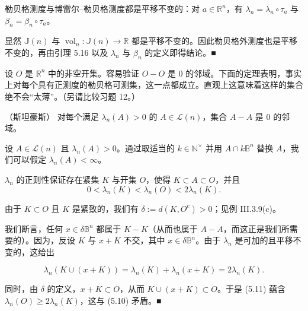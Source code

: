 \begin{theorem}

勒贝格测度与博雷尔–勒贝格测度都是平移不变的：对 $ a \in \mathbb{R}^n $，有 $ \lambda_n = \lambda_n \circ \tau_a $ 与 $ \beta_n = \beta_n \circ \tau_a $。

\proofhead
显然 $ \mathbb{J}(n) $ 与 $ \operatorname{vol}_n: \mathbb{J}(n) \to \mathbb{R} $ 都是平移不变的。因此勒贝格外测度也是平移不变的，再由引理 5.16 以及 $ \lambda_n $ 与 $ \beta_n $ 的定义即得结论。\nobreak\hspace{0.35em}■
\end{theorem}

设 $ O $ 是 $ \mathbb{R}^n $ 中的非空开集。容易验证 $ O - O $ 是 $ 0 $ 的邻域。下面的定理表明，事实上对每个具有正测度的勒贝格可测集，这一点都成立。直观上这意味着这样的集合绝不会“太薄”。（另请比较习题 12。）

\begin{theorem}

（斯坦豪斯） 对每个满足 $ \lambda_n(A) > 0 $ 的 $ A \in \mathcal{L}(n) $，集合 $ A - A $ 是 $ 0 $ 的邻域。

\proofhead
设 $ A \in \mathcal{L}(n) $ 且 $ \lambda_n(A) > 0 $。通过取适当的 $ k \in \mathbb{N}^{\times} $ 并用 $ A \cap k\mathbb{B}^n $ 替换 $ A $，我们可以假定 $ \lambda_n(A) < \infty $。

$ \lambda_n $ 的正则性保证存在紧集 $ K $ 与开集 $ O $，使得 $ K \subset A \subset O $，并且
\begin{equation}
0 < \lambda_n(K) < \lambda_n(O) < 2\lambda_n(K) .\tag{5.10}
\end{equation}

由于 $ K \subset O $ 且 $ K $ 是紧致的，我们有 $ \delta := d(K, O^{c}) > 0 $；见例 III.3.9(c)。

我们断言，任何 $ x \in \delta\mathbb{B}^n $ 都属于 $ K - K $（从而也属于 $ A - A $，而这正是我们所需要的）。因为，反设 $ K $ 与 $ x + K $ 不交，其中 $ x \in \delta\mathbb{B}^n $。由于 $ \lambda_n $ 是可加的且平移不变的，这给出

\begin{equation}
\lambda_n(K \cup (x + K)) = \lambda_n(K) + \lambda_n(x + K) = 2\lambda_n(K) .\tag{5.11}
\end{equation}

同时，由 $ \delta $ 的定义，$ x + K \subset O $，从而 $ K \cup (x + K) \subset O $。于是 (5.11) 蕴含 $ \lambda_n(O) \ge 2\lambda_n(K) $，这与 (5.10) 矛盾。\nobreak\hspace{0.35em}■

\end{theorem}

